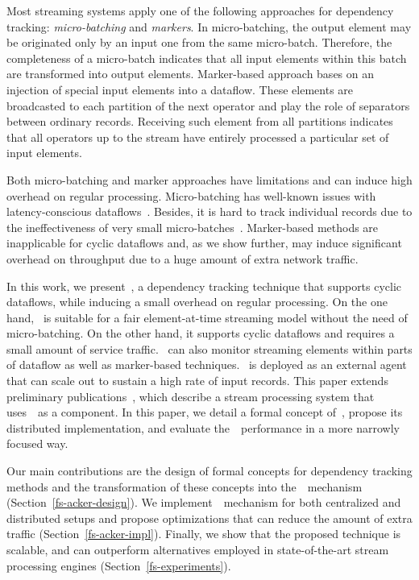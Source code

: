Most streaming systems apply one of the following approaches for dependency tracking: {\em micro-batching} and {\em markers}. In micro-batching, the output element may be originated only by an input one from the same micro-batch. Therefore, the completeness of a micro-batch indicates that all input elements within this batch are transformed into output elements. Marker-based approach bases on an injection of special input elements into a dataflow. These elements are broadcasted to each partition of the next operator and play the role of separators between ordinary records. Receiving such element from all partitions indicates that all operators up to the stream have entirely processed a particular set of input elements. 

Both micro-batching and marker approaches have limitations and can induce high overhead on regular processing. Micro-batching has well-known issues with latency-conscious dataflows~\cite{S7530084}. Besides, it is hard to track individual records due to the ineffectiveness of very small micro-batches~\cite{Zaharia:2012:DSE:2342763.2342773}. Marker-based methods are inapplicable for cyclic dataflows and, as we show further, may induce significant overhead on throughput due to a huge amount of extra network traffic.

In this work, we present~\tracker , a dependency tracking technique that supports cyclic dataflows, while inducing a small overhead on regular processing. On the one hand, \tracker\ is suitable for a fair element-at-time streaming model without the need of micro-batching. On the other hand, it supports cyclic dataflows and requires a small amount of service traffic. \tracker\ can also monitor streaming elements within parts of dataflow as well as marker-based techniques. \tracker\ is deployed as an external agent that can scale out to sustain a high rate of input records. This paper extends preliminary publications~\cite{we2018beyondmr, we2018adbis, thepaper}, which describe a stream processing system that uses~\tracker\ as a component. In this paper, we detail a formal concept of~\tracker , propose its distributed implementation, and evaluate the~\tracker\ performance in a more narrowly focused way.

Our main contributions are the design of formal concepts for dependency tracking methods and the transformation of these concepts into the~\tracker\ mechanism (Section~\ref{fs-acker-design}). We implement~\tracker\ mechanism for both centralized and distributed setups and propose optimizations that can reduce the amount of extra traffic (Section~\ref{fs-acker-impl}). Finally, we show that the proposed technique is scalable, and can outperform alternatives employed in state-of-the-art stream processing engines (Section~\ref{fs-experiments}).